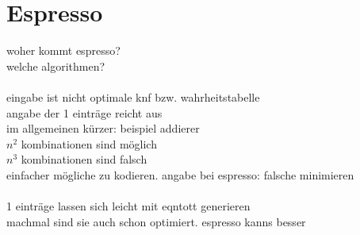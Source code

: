 \section{Espresso}


woher kommt espresso?\\
welche algorithmen?\\
~\\
eingabe ist nicht optimale knf bzw. wahrheitstabelle\\
angabe der 1 einträge reicht aus\\
im allgemeinen kürzer: beispiel addierer\\
$ n^2 $ kombinationen sind möglich\\
$ n^3 $ kombinationen sind falsch\\
einfacher mögliche zu kodieren. angabe bei espresso: falsche minimieren\\
~\\
1 einträge lassen sich leicht mit eqntott generieren\\
machmal sind sie auch schon optimiert. espresso kanns besser